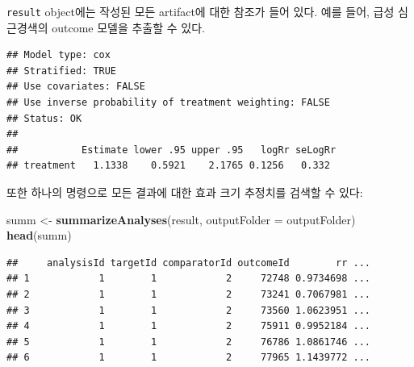 \documentclass[11pt]{book}
\newenvironment{Shaded}{\begin{snugshade}}{\end{snugshade}}
\newcommand{\KeywordTok}[1]{\textcolor[rgb]{0.13,0.29,0.53}{\textbf{#1}}}
\newcommand{\DataTypeTok}[1]{\textcolor[rgb]{0.13,0.29,0.53}{#1}}
\newcommand{\DecValTok}[1]{\textcolor[rgb]{0.00,0.00,0.81}{#1}}
\newcommand{\StringTok}[1]{\textcolor[rgb]{0.31,0.60,0.02}{#1}}
\newcommand{\OperatorTok}[1]{\textcolor[rgb]{0.81,0.36,0.00}{\textbf{#1}}}
\newcommand{\NormalTok}[1]{#1}
\theoremstyle{definition}
\theoremstyle{definition}
\theoremstyle{definition}
\theoremstyle{remark}
\begin{document}
\texttt{result} object에는 작성된 모든 artifact에 대한 참조가 들어 있다.
예를 들어, 급성 심근경색의 outcome 모델을 추출할 수 있다.

\begin{Shaded}
\end{Shaded}

\begin{verbatim}
## Model type: cox
## Stratified: TRUE
## Use covariates: FALSE
## Use inverse probability of treatment weighting: FALSE
## Status: OK
## 
##           Estimate lower .95 upper .95   logRr seLogRr
## treatment   1.1338    0.5921    2.1765 0.1256   0.332
\end{verbatim}

또한 하나의 명령으로 모든 결과에 대한 효과 크기 추정치를 검색할 수 있다:

\begin{Shaded}
\begin{Highlighting}[]
\NormalTok{summ <-}\StringTok{ }\KeywordTok{summarizeAnalyses}\NormalTok{(result, }\DataTypeTok{outputFolder =}\NormalTok{ outputFolder)}
\KeywordTok{head}\NormalTok{(summ)}
\end{Highlighting}
\end{Shaded}

\begin{verbatim}
##     analysisId targetId comparatorId outcomeId        rr ...
## 1            1        1            2     72748 0.9734698 ...
## 2            1        1            2     73241 0.7067981 ...
## 3            1        1            2     73560 1.0623951 ...
## 4            1        1            2     75911 0.9952184 ...
## 5            1        1            2     76786 1.0861746 ...
## 6            1        1            2     77965 1.1439772 ...
\end{verbatim}
\end{document}
